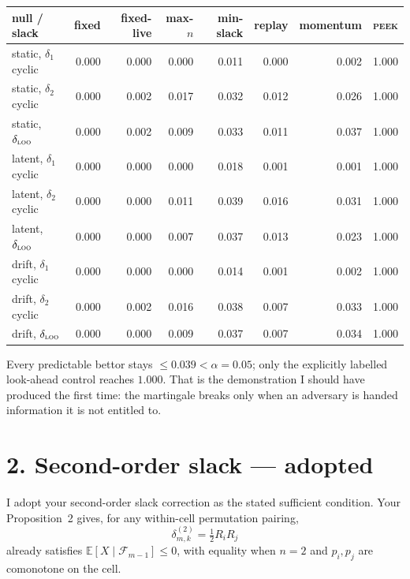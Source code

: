 \documentclass[11pt,a4paper]{article}
\begin{document}
\medskip
\begin{center}
\setlength{\tabcolsep}{5pt}
\begin{tabular}{lrrrrrrr}
\toprule
null / slack & fixed & fixed-live & max-$n$ & min-slack & replay & momentum & \textsc{peek} \\
\midrule
static, $\delta_1$ cyclic   & 0.000 & 0.000 & 0.000 & 0.011 & 0.000 & 0.002 & 1.000 \\
static, $\delta_2$ cyclic   & 0.000 & 0.002 & 0.017 & 0.032 & 0.012 & 0.026 & 1.000 \\
static, $\delta_{\textsc{loo}}$    & 0.000 & 0.002 & 0.009 & 0.033 & 0.011 & 0.037 & 1.000 \\
latent, $\delta_1$ cyclic   & 0.000 & 0.000 & 0.000 & 0.018 & 0.001 & 0.001 & 1.000 \\
latent, $\delta_2$ cyclic   & 0.000 & 0.000 & 0.011 & 0.039 & 0.016 & 0.031 & 1.000 \\
latent, $\delta_{\textsc{loo}}$    & 0.000 & 0.000 & 0.007 & 0.037 & 0.013 & 0.023 & 1.000 \\
drift, $\delta_1$ cyclic    & 0.000 & 0.000 & 0.000 & 0.014 & 0.001 & 0.002 & 1.000 \\
drift, $\delta_2$ cyclic    & 0.000 & 0.002 & 0.016 & 0.038 & 0.007 & 0.033 & 1.000 \\
drift, $\delta_{\textsc{loo}}$     & 0.000 & 0.000 & 0.009 & 0.037 & 0.007 & 0.034 & 1.000 \\
\bottomrule
\end{tabular}
\end{center}

\medskip

Every predictable bettor stays $\le 0.039 < \alpha = 0.05$; only the explicitly
labelled look-ahead control reaches $1.000$.  That is the demonstration I should
have produced the first time: the martingale breaks only when an adversary is
handed information it is not entitled to.

\section*{2. Second-order slack --- adopted}

I adopt your second-order slack correction as the stated sufficient condition.
Your Proposition~2 gives, for any within-cell permutation pairing,
\[
  \delta^{(2)}_{m,k} = \tfrac{1}{2}R_i R_j
\]
already satisfies $\mathbb{E}[X \mid \mathcal{F}_{m-1}] \le 0$, with equality
when $n = 2$ and $p_i, p_j$ are comonotone on the cell.
\end{document}
